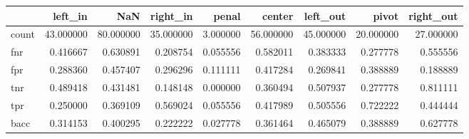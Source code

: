 \begin{tabular}{lrrrrrrrr}
\toprule
{} &    left\_in &        NaN &   right\_in &     penal &     center &   left\_out &      pivot &  right\_out \\
\midrule
count &  43.000000 &  80.000000 &  35.000000 &  3.000000 &  56.000000 &  45.000000 &  20.000000 &  27.000000 \\
fnr   &   0.416667 &   0.630891 &   0.208754 &  0.055556 &   0.582011 &   0.383333 &   0.277778 &   0.555556 \\
fpr   &   0.288360 &   0.457407 &   0.296296 &  0.111111 &   0.417284 &   0.269841 &   0.388889 &   0.188889 \\
tnr   &   0.489418 &   0.431481 &   0.148148 &  0.000000 &   0.360494 &   0.507937 &   0.277778 &   0.811111 \\
tpr   &   0.250000 &   0.369109 &   0.569024 &  0.055556 &   0.417989 &   0.505556 &   0.722222 &   0.444444 \\
bacc  &   0.314153 &   0.400295 &   0.222222 &  0.027778 &   0.361464 &   0.465079 &   0.388889 &   0.627778 \\
\bottomrule
\end{tabular}
